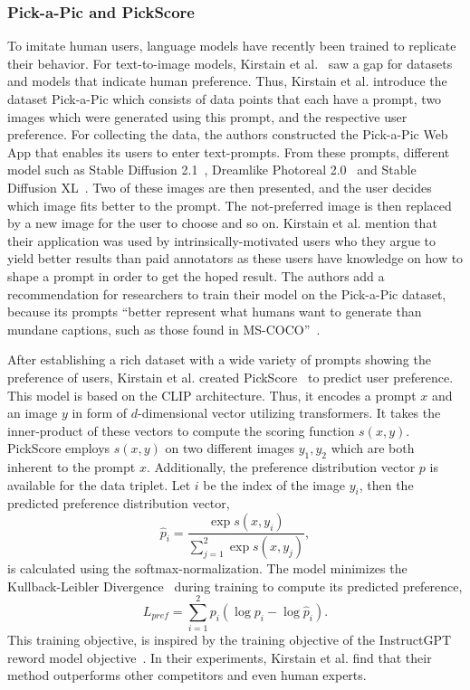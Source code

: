 \subsubsection{Pick-a-Pic and PickScore}
\label{sec:wuerstchen:PickScore}
To imitate human users, language models have recently been trained to replicate
their behavior. For text-to-image models, Kirstain et
al.~\cite{kirstain2023pickapic} saw a gap for datasets and models that
indicate human preference. Thus, Kirstain et al. introduce the dataset
Pick-a-Pic which consists of data points that each have a prompt, two images which
were generated using this prompt, and the respective user preference. For
collecting the data, the authors constructed the Pick-a-Pic Web App that enables
its users to enter text-prompts. From these prompts, different model such as
Stable Diffusion 2.1~\cite{rombach2023sd_2_1}, Dreamlike Photoreal 2.0~\cite{dreamlike_art2024} and
Stable Diffusion XL~\cite{podell2024sdxl}. Two of these images are then
presented, and the user decides which image fits better to the prompt. The
not-preferred image is then replaced by a new image for the user to choose and so on. Kirstain et al.
mention that their application was used by intrinsically-motivated users who
they argue to yield better results than paid annotators as these users have
knowledge on how to shape a prompt in order to get the hoped result. The authors
add a recommendation for researchers to train their model on the Pick-a-Pic
dataset, because its prompts ``better represent what humans want to generate
than mundane captions, such as those found in MS-COCO''~\cite{kirstain2023pickapic}.

After establishing a rich dataset with a wide variety of prompts showing the
preference of users, Kirstain et al. created PickScore~\cite{kirstain2023pickapic}
to predict user preference. This model is based on the CLIP architecture. Thus,
it encodes a prompt $x$ and an image $y$ in form of $d$-dimensional
vector utilizing transformers. It takes the inner-product of these vectors to compute the scoring function
$s(x, y)$. PickScore employs $s(x, y)$ on two different images $y_1, y_2$ which
are both inherent to the prompt $x$. Additionally, the preference distribution
vector $p$ is available for the data triplet. Let $i$ be the index of the image
$y_i$, then the predicted preference distribution vector,
\begin{equation*}
    \hat{p}_i = \frac{\exp s(x, y_i)}{\sum_{j=1}^{2}\exp s(x, y_j)},
\end{equation*}
is calculated using the softmax-normalization. The model minimizes the
Kullback-Leibler Divergence~\cite{kullback1951OnInformationandSufficiency} during training to compute its predicted preference,
\begin{equation*}
    L_{pref} = \sum_{i=1}^{2} p_i (\log p_i - \log\hat{p}_i).
\end{equation*}
This training objective, is inspired
by the training objective of the InstructGPT reword model
objective~\cite{Ouyang2024InstructGPT}. In their experiments, Kirstain et al.
find that their method outperforms other competitors and even human experts.

